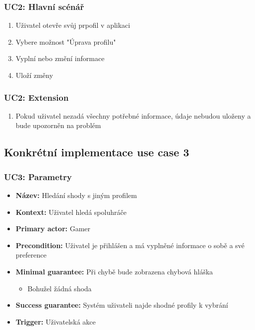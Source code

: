 \documentclass[czech,12pt,a4paper,titlepage]{article}
\begin{document}
\subsubsection{UC2: Hlavní scénář}

\begin{enumerate}
    \item Uživatel otevře svůj prpofil v aplikaci
    \item Vybere možnost "Úprava profilu"
    \item Vyplní nebo změní informace
    \item Uloží změny
\end{enumerate}

\subsubsection{UC2: Extension}

\begin{enumerate}
    \item Pokud uživatel nezadá všechny potřebné informace, údaje nebudou
          uloženy a bude upozorněn  na problém
\end{enumerate}

\clearpage

\subsection{Konkrétní implementace use case 3}

\subsubsection{UC3: Parametry}

\begin{itemize}
    \item \textbf{Název:} Hledání shody s jiným profilem
    \item \textbf{Kontext:} Uživatel hledá spoluhráče
    \item \textbf{Primary actor:} Gamer
    \item \textbf{Precondition:} Uživatel je přihlášen a má vyplněné informace o sobě a své preference
    \item \textbf{Minimal guarantee:} Při chybě bude zobrazena chybová hláška
          \begin{itemize}
              \item Bohužel žádná shoda
          \end{itemize}
    \item \textbf{Success guarantee:} Systém uživateli najde shodné profily k vybrání
    \item \textbf{Trigger:} Uživatelská akce
\end{itemize}
\end{document}
